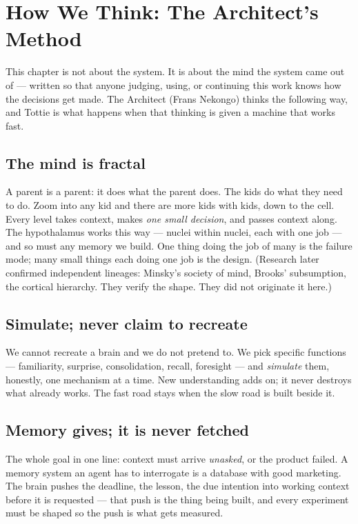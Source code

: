 \chapter{How We Think: The Architect's Method}

This chapter is not about the system. It is about the mind the system came
out of --- written so that anyone judging, using, or continuing this work
knows how the decisions get made. The Architect (Frans Nekongo) thinks the
following way, and Tottie is what happens when that thinking is given a
machine that works fast.

\section{The mind is fractal}
A parent is a parent: it does what the parent does. The kids do what they
need to do. Zoom into any kid and there are more kids with kids, down to
the cell. Every level takes context, makes \emph{one small decision}, and
passes context along. The hypothalamus works this way --- nuclei within
nuclei, each with one job --- and so must any memory we build. One thing
doing the job of many is the failure mode; many small things each doing
one job is the design. (Research later confirmed independent lineages:
Minsky's society of mind, Brooks' subsumption, the cortical hierarchy.
They verify the shape. They did not originate it here.)

\section{Simulate; never claim to recreate}
We cannot recreate a brain and we do not pretend to. We pick specific
functions --- familiarity, surprise, consolidation, recall, foresight ---
and \emph{simulate} them, honestly, one mechanism at a time. New
understanding adds on; it never destroys what already works. The fast road
stays when the slow road is built beside it.

\section{Memory gives; it is never fetched}
The whole goal in one line: context must arrive \emph{unasked}, or the
product failed. A memory system an agent has to interrogate is a database
with good marketing. The brain pushes the deadline, the lesson, the due
intention into working context before it is requested --- that push is
the thing being built, and every experiment must be shaped so the push is
what gets measured.

